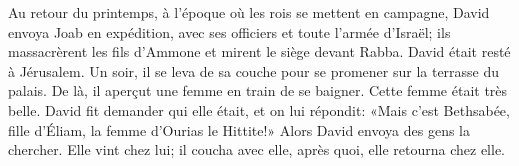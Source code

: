 Au retour du printemps, à l’époque où les rois se mettent en campagne,
	David envoya Joab en expédition, avec ses officiers et toute l’armée d’Israël;
	ils massacrèrent les fils d’Ammone et mirent le siège devant Rabba.
David était resté à Jérusalem.
	Un soir, il se leva de sa couche pour se promener sur la terrasse du palais.
De là, il aperçut une femme en train de se baigner.
	Cette femme était très belle.
David fit demander qui elle était, et on lui répondit:
	«Mais c’est Bethsabée, fille d’Éliam, la femme d’Ourias le Hittite!»
Alors David envoya des gens la chercher.
Elle vint chez lui; il coucha avec elle,
	après quoi, elle retourna chez elle.

